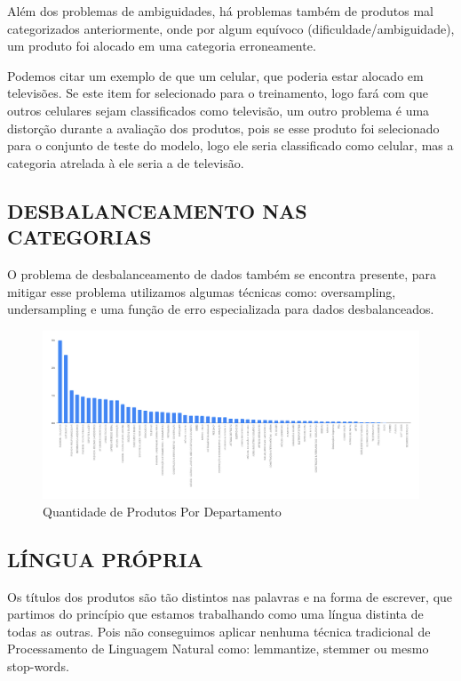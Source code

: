 Além dos problemas de ambiguidades, há problemas também de produtos mal categorizados anteriormente, onde por algum equívoco (dificuldade/ambiguidade), um produto foi alocado em uma categoria erroneamente.

Podemos citar um exemplo de que um celular, que poderia estar alocado em televisões. Se este item for selecionado para o treinamento, logo fará com que outros celulares sejam classificados como televisão, um outro problema é uma distorção durante a avaliação dos produtos, pois se esse produto foi selecionado para o conjunto de teste do modelo, logo ele seria classificado como celular, mas a categoria atrelada à ele seria a de televisão.

\subsection{DESBALANCEAMENTO NAS CATEGORIAS}

O problema de desbalanceamento de dados também se encontra presente, para mitigar esse problema utilizamos algumas técnicas como: oversampling, undersampling e  uma função de erro especializada para  dados desbalanceados.

\begin{figure}[htb]
	\caption{\label{char_bar_produtos_por_categoria} Quantidade de Produtos Por Departamento}
	\begin{center}
	    \includegraphics[width=\textwidth]{artigo/recursos/imagens/char_bar_produtos_por_categoria.png}
	\end{center}
\end{figure}

\subsection{LÍNGUA PRÓPRIA}

Os títulos dos produtos são tão distintos nas palavras e na forma de escrever, que partimos do princípio que estamos trabalhando como uma língua distinta de todas as outras. Pois não conseguimos aplicar nenhuma técnica tradicional de Processamento de Linguagem Natural como: lemmantize, stemmer ou mesmo stop-words.

